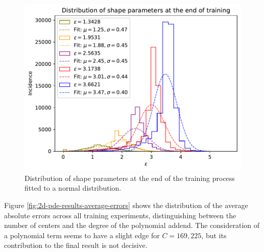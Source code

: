 \documentclass[12pt]{report} %
\begin{document}
\begin{figure}[h]
  \includegraphics[width=.8\textwidth]{imagenes/experiments/2d/pde_parabola/distribution_of_shape_parameters_at_end_of_training.pdf}
  \caption{Distribution of shape parameters at the end of the training process fitted to a normal distribution.}
  \label{fig:2d-pde-results-shape-parameters}
\end{figure}


Figure \ref{fig:2d-pde-results-average-errors} shows the distribution of the average absolute errors across all training experiments, distinguishing between the number of centers and the degree of the polynomial addend. The consideration of a polynomial term seems to have a slight edge for $C=169,225$, but its contribution to the final result is not decisive. 
\end{document}
